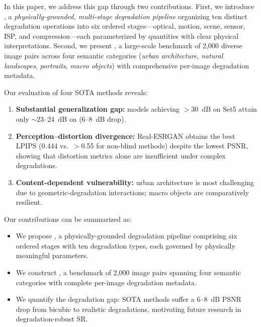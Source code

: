 In this paper, we address this gap through two contributions.
First, we introduce \pipeline, a \textit{physically-grounded, multi-stage degradation pipeline} organizing ten distinct degradation operations into six ordered stages---optical, motion, scene, sensor, ISP, and compression---each parameterized by quantities with clear physical interpretations.
Second, we present \dataset, a large-scale benchmark of 2{,}000 diverse image pairs across four semantic categories (\textit{urban architecture}, \textit{natural landscapes}, \textit{portraits}, \textit{macro objects}) with comprehensive per-image degradation metadata.

Our evaluation of four SOTA methods reveals:
\begin{enumerate}[leftmargin=*,itemsep=1pt,topsep=2pt]
    \item \textbf{Substantial generalization gap:} models achieving ${>}$30~dB on Set5 attain only ${\sim}$23--24~dB on \dataset (6--8~dB drop).
    \item \textbf{Perception--distortion divergence:} Real-ESRGAN obtains the best LPIPS (0.444 vs.\ ${>}$0.55 for non-blind methods) despite the lowest PSNR, showing that distortion metrics alone are insufficient under complex degradations.
    \item \textbf{Content-dependent vulnerability:} urban architecture is most challenging due to geometric-degradation interactions; macro objects are comparatively resilient.
\end{enumerate}

\noindent Our contributions can be summarized as:
\begin{itemize}[leftmargin=*,itemsep=1pt,topsep=2pt]
    \item We propose \pipeline, a physically-grounded degradation pipeline comprising six ordered stages with ten degradation types, each governed by physically meaningful parameters.
    \item We construct \dataset, a benchmark of 2{,}000 image pairs spanning four semantic categories with complete per-image degradation metadata.
    \item We quantify the degradation gap: SOTA methods suffer a 6--8~dB PSNR drop from bicubic to realistic degradations, motivating future research in degradation-robust SR.
\end{itemize}
